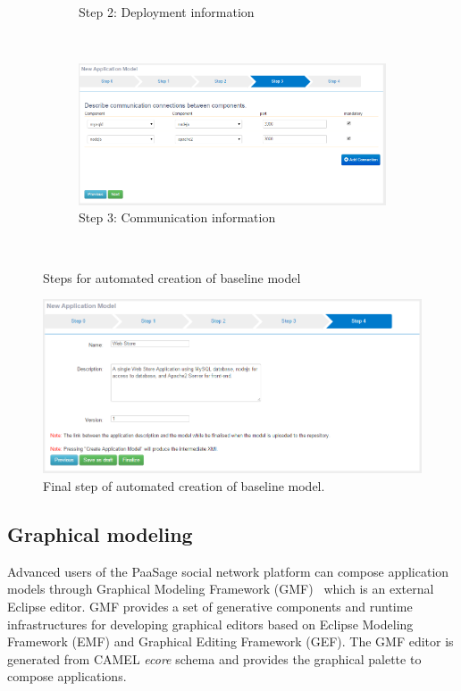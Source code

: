 \begin{figure}
\begin{subfigure}{.8\textwidth}
  \caption{Step 2: Deployment information}
  \label{fig:sfig2}
\end{subfigure} \\[1ex]
\begin{subfigure}{.8\textwidth}
  \centering
  \includegraphics[scale=0.4]{./fig/model_creation3.png}
  \caption{Step 3: Communication information}
  \label{fig:sfig3}
\end{subfigure} \\[1ex]
\caption{Steps for automated creation of baseline model}
\label{fig:model_creation_0}
\end{figure}

\begin{figure}
  \centering
  \includegraphics[scale=0.4]{./fig/model_creation4.png}
  \caption{Final step of automated creation of baseline model.}
  \label{fig:sfig4}
\end{figure}


\subsection{Graphical modeling}
\label{sec:gmf}
Advanced users of the PaaSage social network platform can compose application models through Graphical Modeling Framework (GMF)~\cite{gmf_url} which is an external Eclipse editor. GMF provides a set of generative components and runtime infrastructures for developing graphical editors based on Eclipse Modeling Framework (EMF) and Graphical Editing Framework (GEF). The GMF editor is generated from CAMEL {\em ecore} schema and provides the graphical palette to compose applications. 

